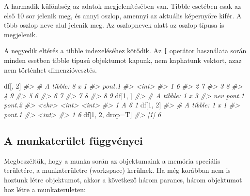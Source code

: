\documentclass[
]{book}
\newenvironment{Shaded}{\begin{snugshade}}{\end{snugshade}}
\newcommand{\CommentTok}[1]{\textcolor[rgb]{0.56,0.35,0.01}{\textit{#1}}}
\newcommand{\DecValTok}[1]{\textcolor[rgb]{0.00,0.00,0.81}{#1}}
\newcommand{\NormalTok}[1]{#1}
\newcommand{\OtherTok}[1]{\textcolor[rgb]{0.56,0.35,0.01}{#1}}
\begin{document}
A harmadik különbség az adatok megjelenítésében van. Tibble esetében csak az első 10 sor jelenik meg, és annyi oszlop, amennyi az aktuális képernyőre kifér. A több oszlop neve alul jelenik meg. Az oszlopnevek alatt az oszlop típusa is megjelenik.

A negyedik eltérés a tibble indexeléséhez kötődik. Az \texttt{{[}} operátor használata során minden esetben tibble típusú objektumot kapunk, nem kaphatunk vektort, azaz nem történhet dimenzióvesztés.

\begin{Shaded}
\begin{Highlighting}[]
\NormalTok{df[, }\DecValTok{2}\NormalTok{]}
\CommentTok{\#\textgreater{} \# A tibble: 8 x 1}
\CommentTok{\#\textgreater{}   pont.1}
\CommentTok{\#\textgreater{}    \textless{}int\textgreater{}}
\CommentTok{\#\textgreater{} 1      6}
\CommentTok{\#\textgreater{} 2      7}
\CommentTok{\#\textgreater{} 3      8}
\CommentTok{\#\textgreater{} 4      9}
\CommentTok{\#\textgreater{} 5      6}
\CommentTok{\#\textgreater{} 6      7}
\CommentTok{\#\textgreater{} 7      8}
\CommentTok{\#\textgreater{} 8      9}
\NormalTok{df[}\DecValTok{1}\NormalTok{, ]}
\CommentTok{\#\textgreater{} \# A tibble: 1 x 3}
\CommentTok{\#\textgreater{}   nev   pont.1 pont.2}
\CommentTok{\#\textgreater{}   \textless{}chr\textgreater{}  \textless{}int\textgreater{}  \textless{}int\textgreater{}}
\CommentTok{\#\textgreater{} 1 A          6      1}
\NormalTok{df[}\DecValTok{1}\NormalTok{, }\DecValTok{2}\NormalTok{]}
\CommentTok{\#\textgreater{} \# A tibble: 1 x 1}
\CommentTok{\#\textgreater{}   pont.1}
\CommentTok{\#\textgreater{}    \textless{}int\textgreater{}}
\CommentTok{\#\textgreater{} 1      6}
\NormalTok{df[}\DecValTok{1}\NormalTok{, }\DecValTok{2}\NormalTok{, drop}\OtherTok{=}\NormalTok{T]}
\CommentTok{\#\textgreater{} [1] 6}
\end{Highlighting}
\end{Shaded}

\hypertarget{a-munkateruxfclet-fuxfcggvuxe9nyei}{%
\subsection{A munkaterület függvényei}\label{a-munkateruxfclet-fuxfcggvuxe9nyei}}

Megbeszéltük, hogy a munka során az objektumaink a memória speciális területére, a munkaterületre (workspace) kerülnek. Ha még korábban nem is hoztunk létre objektumot, akkor a következő három parancs, három objektumot hoz létre a munkaterületen:
\end{document}
